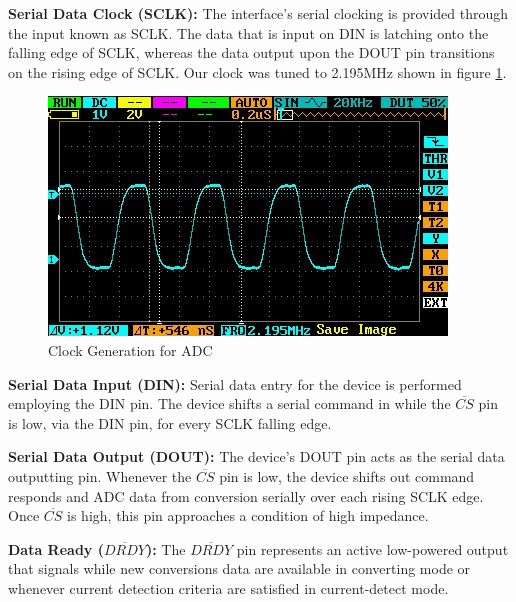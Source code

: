 \textbf{Serial Data Clock (SCLK):} The interface's serial clocking is provided through the input known as SCLK. The data that is input on DIN is latching onto the falling edge of SCLK, whereas the data output upon the DOUT pin transitions on the rising edge of SCLK. Our clock was tuned to 2.195MHz shown in figure \ref{fig:x Clock Generation}. \par
\begin{figure}[htbp]
\centering
\includegraphics[scale=0.6]{images/2.195MHz.jpg}
\caption{Clock Generation for ADC}
\label{fig:x Clock Generation}
\end{figure}

\textbf{Serial Data Input (DIN):} Serial data entry for the device is performed employing the DIN pin. The device shifts a serial command in while the $\overline{CS}$ pin is low, via the DIN pin, for every SCLK falling edge. \par

\textbf{Serial Data Output (DOUT):} The device's DOUT pin acts as the serial data outputting pin. Whenever the $\overline{CS}$ pin is low, the device shifts out command responds and ADC data from conversion serially over each rising SCLK edge. Once $\overline{CS}$ is high, this pin approaches a condition of high impedance. \par

\textbf{Data Ready ($\overline{DRDY}$):} The $\overline{DRDY}$ pin represents an active low-powered output that signals while new conversions data are available in converting mode or whenever current detection criteria are satisfied in current-detect mode. \par

